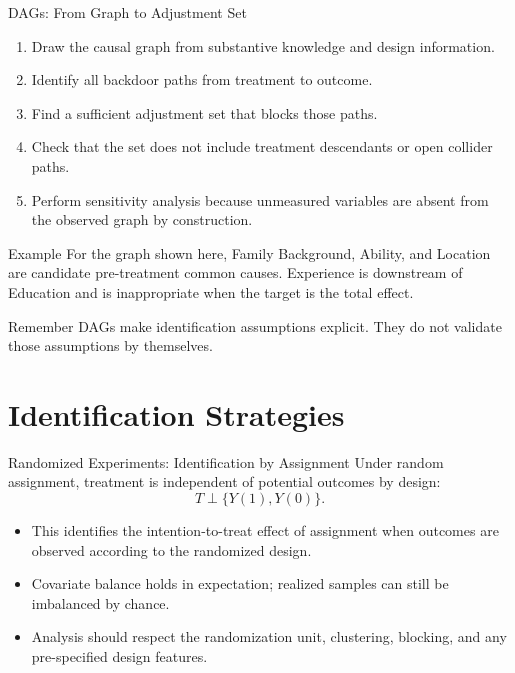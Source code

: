 \documentclass[aspectratio=169,11pt]{beamer}
\begin{document}
\begin{frame}{DAGs: From Graph to Adjustment Set}
\begin{enumerate}
  \item Draw the causal graph from substantive knowledge and design information.
  \item Identify all backdoor paths from treatment to outcome.
  \item Find a sufficient adjustment set that blocks those paths.
  \item Check that the set does not include treatment descendants or open collider paths.
  \item Perform sensitivity analysis because unmeasured variables are absent from the observed graph by construction.
\end{enumerate}

\begin{block}{Example}
For the graph shown here, Family Background, Ability, and Location are candidate pre-treatment common causes. Experience is downstream of Education and is inappropriate when the target is the total effect.
\end{block}

\begin{alertblock}{Remember}
DAGs make identification assumptions explicit. They do not validate those assumptions by themselves.
\end{alertblock}
\end{frame}

\section{Identification Strategies}

\begin{frame}{Randomized Experiments: Identification by Assignment}
Under random assignment, treatment is independent of potential outcomes by design:
\[
  T \perp \{Y(1),Y(0)\}.
\]

\begin{itemize}
  \item This identifies the intention-to-treat effect of assignment when outcomes are observed according to the randomized design.
  \item Covariate balance holds in expectation; realized samples can still be imbalanced by chance.
  \item Analysis should respect the randomization unit, clustering, blocking, and any pre-specified design features.
\end{itemize}
\end{frame}
\end{document}
